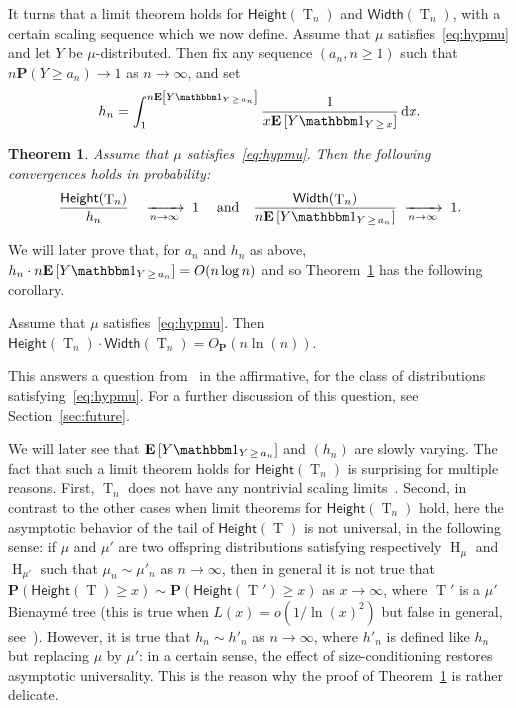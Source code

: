\documentclass[10pt]{amsart}
\newtheorem{theo}{Theorem}[section]
\theoremstyle{definition}\newtheorem{defi}[theo]{Definition}\newtheorem{rema}[theo]{Remark}\newtheorem{exam}[theo]{Example}\newtheorem{exem}[theo]{Example}\newtheorem{nota}[theo]{Notation}
\renewcommand{\H}{\mathsf{Height}}
\newcommand{\p}{\mathbf{P}}
\newcommand{\Width}{\mathsf{Width}}
\newcommand{\E}[1]{{\mathbf E}\left[#1\right]}
\DeclareMathOperator{\rtree}{T}
\DeclareMathOperator{\dxseq}{d\mathit{x}}
\DeclareMathOperator{\rmH}{H}
\newcommand{\I}[1]{{\mathbbm 1}_{#1}}
\begin{document}
It turns that a limit theorem holds for $\H(\rtree_{n})$ and $\Width(\rtree_{n})$, with a certain scaling sequence which we now define. Assume that $\mu$ satisfies~\eqref{eq:hypmu} and let $Y$ be $\mu$-distributed. Then fix any sequence $(a_n,n \ge 1)$ such that $n \p(Y \ge a_n) \to 1$ as $n \to \infty$, and set
\begin{equation}\label{eq:hn}
h_n = \int_1^{n \E{Y\I{Y\,\ge\,a_n}}} \frac{1}{ x \E{Y \I{Y\,\ge\,x}}} \dxseq\!.
\end{equation}
\begin{theo}\label{thm:heightCauchy0}
Assume that $\mu$ satisfies~\eqref{eq:hypmu}. Then the following convergences holds in probability:
\[
\frac{\H(\rtree_{n})}{h_{n}} \quad \xrightarrow[n\to\infty]{} \; 1 \; \quad\text{and} \quad \frac{\Width(\rtree_{n})}{n \E{Y\I{Y\,\ge\,a_n}}} \; \xrightarrow[n\to\infty]{} \; 1.
\]
\end{theo}

We will later prove that, for $a_n$ and $h_n$ as above, $h_{n}\cdot n \E{Y\I{Y\,\ge\,a_n}}=O(n \log n)$ and so Theorem~\ref{thm:heightCauchy0} has the following corollary.
\begin{coro}\label{cor:hw}
Assume that $\mu$ satisfies~\eqref{eq:hypmu}. Then $\H(\rtree_{n}) \cdot \Width(\rtree_{n}) = O_{\p}({n \ln(n)})$.
\end{coro}

This answers a question from~\cite{Add19} in the affirmative, for the class of distributions satisfying~\eqref{eq:hypmu}. For a further discussion of this question, see Section~\ref{sec:future}.

We will later see that $\E{Y\I{Y\,\ge\,a_n}}$ and $(h_{n})$ are slowly varying. The fact that such a limit theorem holds for $\H(\rtree_{n})$ is surprising for multiple reasons. First, $\rtree_{n}$ does not have any nontrivial scaling limits~\cite{KR19}. Second, in contrast to the other cases when limit theorems for $\H(\rtree_{n})$ hold, here the asymptotic behavior of the tail of $\H(\rtree)$ is not universal, in the following sense: if $\mu$ and $\mu'$ are two offspring distributions satisfying respectively $\rmH_\mu$ and $\rmH_{\mu'}$ such that $\mu_n \sim \mu'_n$ as $n \rightarrow \infty$, then in general it is not true that $\p(\H(\rtree) \geq x) \sim \p(\H(\rtree') \geq x)$ as $ x \rightarrow \infty$, where $\rtree'$ is a $\mu'$ Bienaymé tree (this is true when $L(x)=o(1/\ln(x)^{2})$ but false in general, see~\cite[Section~3.2]{NW07}). However, it is true that $h_{n} \sim h'_{n}$ as $n \rightarrow \infty$, where $h'_{n}$ is defined like $h_{n}$ but replacing $\mu$ by $\mu'$: in a certain sense, the effect of size-conditioning restores asymptotic universality. This is the reason why the proof of Theorem~\ref{thm:heightCauchy0} is rather delicate.
\end{document}

